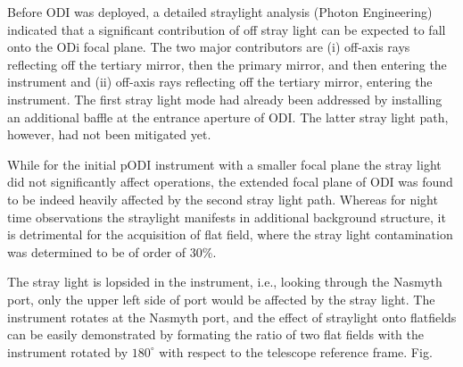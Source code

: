 \documentclass[]{spieman}
\begin{document}
Before ODI was deployed, a detailed straylight analysis (Photon Engineering)
indicated that a significant contribution of off stray light can be expected
to fall onto the ODi focal plane. The two major contributors are (i)
off-axis rays reflecting off the tertiary mirror, then the primary mirror,
and then entering the instrument and (ii) off-axis rays reflecting off the
tertiary mirror, entering the instrument. The first stray light mode had
already been addressed by installing an additional baffle at the entrance
aperture of ODI. The latter stray light path, however, had not been
mitigated yet.

While for the initial pODI instrument with a smaller focal plane the stray
light did not significantly affect operations, the extended focal plane of
ODI was found to be indeed heavily affected by the second stray light path.
Whereas for night time observations the straylight manifests in additional
background structure, it is detrimental for the acquisition of flat field,
where the stray light contamination was determined to be of order of 30\%.

The stray light is lopsided in the instrument, i.e., looking through the
Nasmyth port, only the upper left side of port would be affected by the
stray light. The instrument rotates at the Nasmyth port, and the effect of
straylight onto flatfields can be easily demonstrated by formating the ratio
of two flat fields with the instrument rotated by $180^\circ$ with respect
to the telescope reference frame. Fig. \label{fig_flatfieldbaffle}
\end{document}
